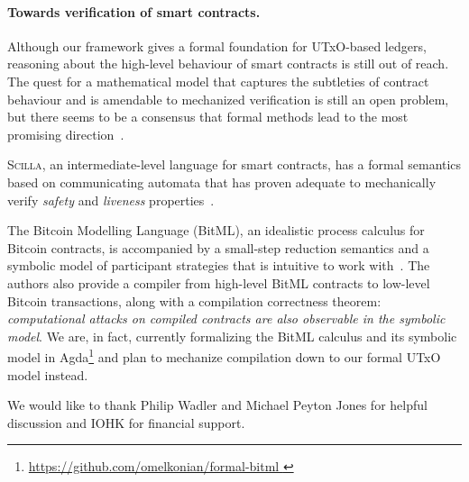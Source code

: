 \documentclass[sigplan,review,screen]{acmart}\settopmatter{printfolios=true,printccs=false,printacmref=false}
\newcommand\site[1]{\footnote{\url{#1}}}
\begin{document}
\paragraph{Towards verification of smart contracts.}
Although our framework gives a formal foundation for UTxO-based ledgers,
reasoning about the high-level behaviour of smart contracts is still out of reach.
The quest for a mathematical model that captures the subtleties of contract behaviour
and is amendable to mechanized verification is still an open problem,
but there seems to be a consensus that formal methods lead to the most promising direction~\cite{smartcontracts}.

\textsc{Scilla}, an intermediate-level language for smart contracts,
has a formal semantics based on communicating automata that has proven adequate
to mechanically verify \textit{safety} and \textit{liveness} properties~\cite{scilla}.

The Bitcoin Modelling Language (BitML), an idealistic process calculus for Bitcoin contracts,
is accompanied by a small-step reduction semantics
and a symbolic model of participant strategies that is intuitive to work with~\cite{bitml}.
The authors also provide a compiler from high-level BitML contracts to low-level Bitcoin transactions,
along with a compilation correctness theorem:
\textit{computational attacks on compiled contracts are also observable in the symbolic model}.
We are, in fact, currently formalizing the BitML calculus and its symbolic model in Agda\site{
https://github.com/omelkonian/formal-bitml
} and plan to mechanize compilation down to our formal UTxO model instead.

\begin{acks}
We would like to thank Philip Wadler and Michael Peyton Jones for helpful discussion and IOHK for financial support.
\end{acks}


\end{document}
